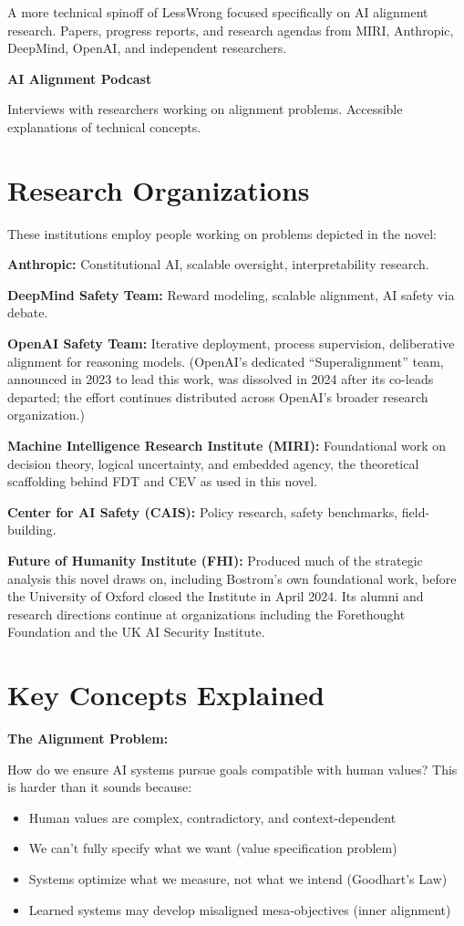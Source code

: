 A more technical spinoff of LessWrong focused specifically on AI alignment research. Papers, progress reports, and research agendas from MIRI, Anthropic, DeepMind, OpenAI, and independent researchers.

\textbf{AI Alignment Podcast}

Interviews with researchers working on alignment problems. Accessible explanations of technical concepts.

\section*{Research Organizations}

These institutions employ people working on problems depicted in the novel:

\textbf{Anthropic:} Constitutional AI, scalable oversight, interpretability research.

\textbf{DeepMind Safety Team:} Reward modeling, scalable alignment, AI safety via debate.

\textbf{OpenAI Safety Team:} Iterative deployment, process supervision, deliberative alignment for reasoning models. (OpenAI's dedicated ``Superalignment'' team, announced in 2023 to lead this work, was dissolved in 2024 after its co-leads departed; the effort continues distributed across OpenAI's broader research organization.)

\textbf{Machine Intelligence Research Institute (MIRI):} Foundational work on decision theory, logical uncertainty, and embedded agency, the theoretical scaffolding behind FDT and CEV as used in this novel.

\textbf{Center for AI Safety (CAIS):} Policy research, safety benchmarks, field-building.

\textbf{Future of Humanity Institute (FHI):} Produced much of the strategic analysis this novel draws on, including Bostrom's own foundational work, before the University of Oxford closed the Institute in April 2024. Its alumni and research directions continue at organizations including the Forethought Foundation and the UK AI Security Institute.

\section*{Key Concepts Explained}

\textbf{The Alignment Problem:}

How do we ensure AI systems pursue goals compatible with human values? This is harder than it sounds because:
\begin{itemize}
\item Human values are complex, contradictory, and context-dependent
\item We can't fully specify what we want (value specification problem)
\item Systems optimize what we measure, not what we intend (Goodhart's Law)
\item Learned systems may develop misaligned mesa-objectives (inner alignment)
\end{itemize}

